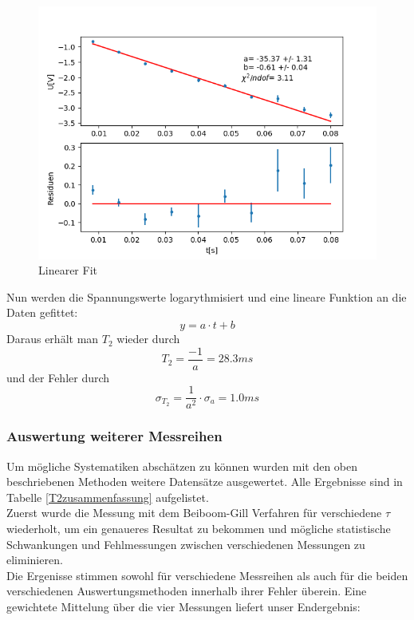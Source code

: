 \documentclass[12pt,a4paper]{article}
\begin{document}
\begin{figure}
\centering
\includegraphics[scale=0.9]{Bilder/T2lin.png}
\caption{Linearer Fit}
\label{fig:T2lin}
\end{figure}

Nun werden die Spannungswerte logarythmisiert und eine lineare Funktion an die Daten gefittet:
\begin{equation}
y = a \cdot t + b
\end{equation}
Daraus erhält man $T_2$ wieder durch 
\begin{equation*}
T_2 = \dfrac{-1}{a} = 28.3ms
\end{equation*}
und der Fehler durch
\begin{equation*}
\sigma_{T_2} = \dfrac{1}{a^2} \cdot \sigma_a = 1.0ms
\end{equation*}

\subsubsection{Auswertung weiterer Messreihen}

Um mögliche Systematiken abschätzen zu können wurden mit den oben beschriebenen Methoden weitere Datensätze ausgewertet. Alle Ergebnisse sind in Tabelle \ref{T2zusammenfassung} aufgelistet.\\
Zuerst wurde die Messung mit dem Beiboom-Gill Verfahren für verschiedene $\tau$ wiederholt, um ein genaueres Resultat zu bekommen und mögliche statistische Schwankungen und Fehlmessungen zwischen verschiedenen Messungen zu eliminieren.\\
Die Ergenisse stimmen sowohl für verschiedene Messreihen als auch für die beiden verschiedenen Auswertungsmethoden innerhalb ihrer Fehler überein. 	Eine gewichtete Mittelung über die vier Messungen liefert unser Endergebnis:
\end{document}
